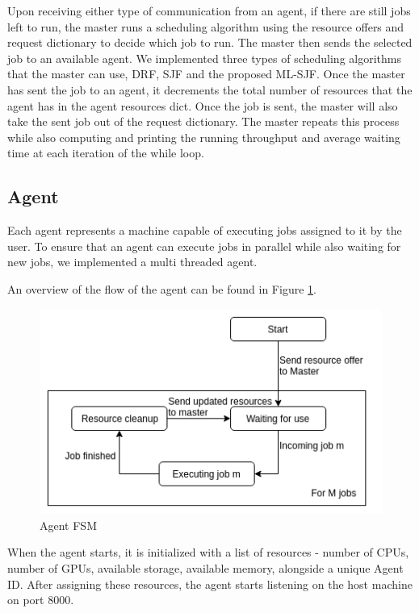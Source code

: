 \documentclass{hotnets19}
\begin{document}
Upon receiving either type of communication from an agent, if there are still jobs left to run, the master runs a scheduling algorithm using the resource offers and request dictionary to decide which job to run. The master then sends the selected job to an available agent. We implemented three types of scheduling algorithms that the master can use, DRF, SJF and the proposed ML-SJF. Once the master has sent the job to an agent, it decrements the total number of resources that the agent has in the agent resources dict. Once the job is sent, the master will also take the sent job out of the request dictionary. The master repeats this process while also computing and printing the running throughput and average waiting time at each iteration of the while loop.

\subsection{Agent}
Each agent represents a machine capable of executing jobs assigned to it by the user. To ensure that an agent can execute jobs in parallel while also waiting for new jobs, we implemented a multi threaded agent. 

An overview of the flow of the agent can be found in Figure \ref{fig:agent_fsm}.

\begin{figure}[!tbh]
    \centering
    \includegraphics[width=\columnwidth]{hotnets19-template/agent.png}
    \caption{Agent FSM}
    \label{fig:agent_fsm}
\end{figure}

When the agent starts, it is initialized with a list of resources - number of CPUs, number of GPUs, available storage, available memory, alongside a unique Agent ID. After assigning these resources, the agent starts listening on the host machine on port 8000. 
\end{document}
